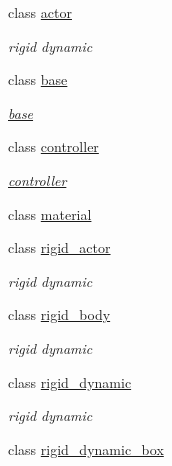 \begin{DoxyCompactItemize}
\item 
class \hyperlink{classnebula_1_1content_1_1actor_1_1admin_1_1actor}{actor}
\begin{DoxyCompactList}\small\item\em rigid dynamic \item\end{DoxyCompactList}\item 
class \hyperlink{classnebula_1_1content_1_1actor_1_1admin_1_1base}{base}
\begin{DoxyCompactList}\small\item\em \hyperlink{classnebula_1_1content_1_1actor_1_1admin_1_1base}{base} \item\end{DoxyCompactList}\item 
class \hyperlink{classnebula_1_1content_1_1actor_1_1admin_1_1controller}{controller}
\begin{DoxyCompactList}\small\item\em \hyperlink{classnebula_1_1content_1_1actor_1_1admin_1_1controller}{controller} \item\end{DoxyCompactList}\item 
class \hyperlink{classnebula_1_1content_1_1actor_1_1admin_1_1material}{material}
\item 
class \hyperlink{classnebula_1_1content_1_1actor_1_1admin_1_1rigid__actor}{rigid\_\-actor}
\begin{DoxyCompactList}\small\item\em rigid dynamic \item\end{DoxyCompactList}\item 
class \hyperlink{classnebula_1_1content_1_1actor_1_1admin_1_1rigid__body}{rigid\_\-body}
\begin{DoxyCompactList}\small\item\em rigid dynamic \item\end{DoxyCompactList}\item 
class \hyperlink{classnebula_1_1content_1_1actor_1_1admin_1_1rigid__dynamic}{rigid\_\-dynamic}
\begin{DoxyCompactList}\small\item\em rigid dynamic \item\end{DoxyCompactList}\item 
class \hyperlink{classnebula_1_1content_1_1actor_1_1admin_1_1rigid__dynamic__box}{rigid\_\-dynamic\_\-box}

\end{DoxyCompactItemize}
